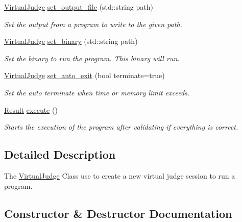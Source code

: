 \begin{DoxyCompactItemize}
\mbox{\hyperlink{classtestcaser_1_1integrator_1_1VirtualJudge}{Virtual\+Judge}} \mbox{\hyperlink{classtestcaser_1_1integrator_1_1VirtualJudge_a9f054aac69019e5f6bde646ccc72effb}{set\+\_\+output\+\_\+file}} (std\+::string path)
\begin{DoxyCompactList}\small\item\em Set the output from a program to write to the given path. \end{DoxyCompactList}\item 
\mbox{\hyperlink{classtestcaser_1_1integrator_1_1VirtualJudge}{Virtual\+Judge}} \mbox{\hyperlink{classtestcaser_1_1integrator_1_1VirtualJudge_ae9fc3d7bf1bf75fc1ec695fe831d16b6}{set\+\_\+binary}} (std\+::string path)
\begin{DoxyCompactList}\small\item\em Set the binary to run the program. This binary will run. \end{DoxyCompactList}\item 
\mbox{\hyperlink{classtestcaser_1_1integrator_1_1VirtualJudge}{Virtual\+Judge}} \mbox{\hyperlink{classtestcaser_1_1integrator_1_1VirtualJudge_a9160dd070c63084495fe6d29cab58cb4}{set\+\_\+auto\+\_\+exit}} (bool terminate=true)
\begin{DoxyCompactList}\small\item\em Set the auto terminate when time or memory limit exceeds. \end{DoxyCompactList}\item 
\mbox{\hyperlink{classtestcaser_1_1integrator_1_1Result}{Result}} \mbox{\hyperlink{classtestcaser_1_1integrator_1_1VirtualJudge_ab50e9c4506fba192fd44fce0f2a21744}{execute}} ()
\begin{DoxyCompactList}\small\item\em Starts the execution of the program after validating if everything is correct. \end{DoxyCompactList}\end{DoxyCompactItemize}


\subsection{Detailed Description}
The \mbox{\hyperlink{classtestcaser_1_1integrator_1_1VirtualJudge}{Virtual\+Judge}} Class use to create a new virtual judge session to run a program. 



\subsection{Constructor \& Destructor Documentation}
\mbox{\label{classtestcaser_1_1integrator_1_1VirtualJudge_a10b68744cc523bcc8abe1ddca7a281dc}} 
